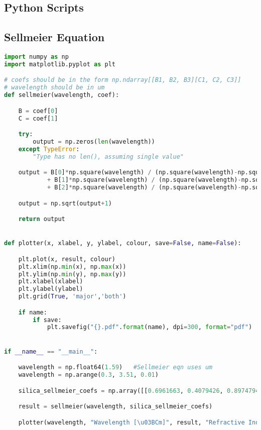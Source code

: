 \newpage
\pagestyle{empty}
\begin{appendices}

\section{Python Scripts}
\subsection{Sellmeier Equation}
\label{sec:appendices:sellmeier}

\begin{lstlisting}[language=Python]
import numpy as np
import matplotlib.pyplot as plt

# coefs should be in the form np.ndarray[[B1, B2, B3][C1, C2, C3]]
# wavelength should be in um
def sellmeier(wavelength, coef):

    B = coef[0]
    C = coef[1]

    try:
        output = np.zeros(len(wavelength))
    except TypeError:
        "Type has no len(), assuming single value"

    output = B[0]*np.square(wavelength) / (np.square(wavelength)-np.square(C[0]))   \
            + B[1]*np.square(wavelength) / (np.square(wavelength)-np.square(C[1]))  \
            + B[2]*np.square(wavelength) / (np.square(wavelength)-np.square(C[2]))

    output = np.sqrt(output+1)

    return output


def plotter(x, xlabel, y, ylabel, colour, save=False, name=False):

    plt.plot(x, result, colour)
    plt.xlim(np.min(x), np.max(x))
    plt.ylim(np.min(y), np.max(y))
    plt.xlabel(xlabel)
    plt.ylabel(ylabel)
    plt.grid(True, 'major','both')

    if name:
        if save:
            plt.savefig("{}.pdf".format(name), dpi=300, format="pdf")


if __name__ == "__main__":

    wavelength = np.float64(1.59)   #Sellmeier eqn uses um
    wavelength = np.arange(0.3, 3.51, 0.01)

    silica_sellmeier_coefs = np.array([[0.6961663, 0.4079426, 0.8974794], [0.0684043, 0.1162414, 9.896161]])

    result = sellmeier(wavelength, silica_sellmeier_coefs)

    plotter(wavelength, "Wavelength [\u03BCm]", result, "Refractive Index",  'r-', save=True, name='silica_refractive_index' )
\end{lstlisting}

\end{appendices}
